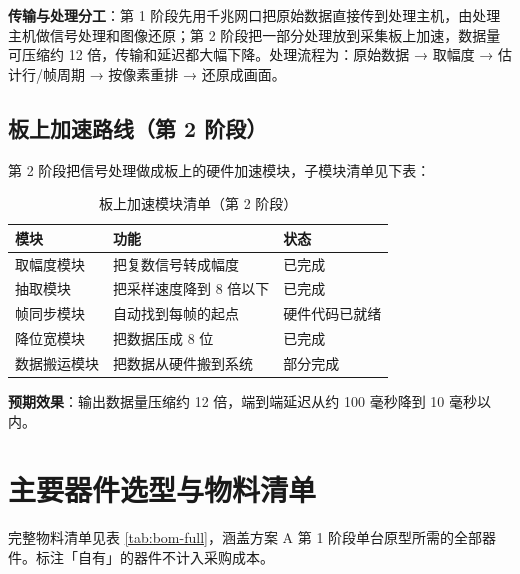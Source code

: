 \documentclass[a4paper,11pt,oneside,UTF8,scheme=plain]{ctexart}
\begin{document}
\textbf{传输与处理分工}：第 1 阶段先用千兆网口把原始数据直接传到处理主机，由处理主机做信号处理和图像还原；第 2 阶段把一部分处理放到采集板上加速，数据量可压缩约 12 倍，传输和延迟都大幅下降。处理流程为：原始数据 → 取幅度 → 估计行/帧周期 → 按像素重排 → 还原成画面。

\subsection{板上加速路线（第 2 阶段）}
\label{sec:ch4-accel}

第 2 阶段把信号处理做成板上的硬件加速模块，子模块清单见下表：

\begin{table}[H]
\centering
\caption{板上加速模块清单（第 2 阶段）}
\label{tab:accel-modules}
\footnotesize
\begin{tabularx}{\textwidth}{l>{\raggedright\arraybackslash}Xl}
\toprule
\rowcolor{tableheader}
\textbf{模块} & \textbf{功能} & \textbf{状态} \\
\midrule
取幅度模块   & 把复数信号转成幅度 & 已完成 \\
抽取模块     & 把采样速度降到 8 倍以下 & 已完成 \\
帧同步模块   & 自动找到每帧的起点 & 硬件代码已就绪 \\
降位宽模块   & 把数据压成 8 位 & 已完成 \\
数据搬运模块 & 把数据从硬件搬到系统 & 部分完成 \\
\bottomrule
\end{tabularx}
\end{table}

\textbf{预期效果}：输出数据量压缩约 12 倍，端到端延迟从约 100 毫秒降到 10 毫秒以内。

\section{主要器件选型与物料清单}
\label{sec:ch5}

完整物料清单见表 \ref{tab:bom-full}，涵盖方案 A 第 1 阶段单台原型所需的全部器件。标注「自有」的器件不计入采购成本。
\end{document}

